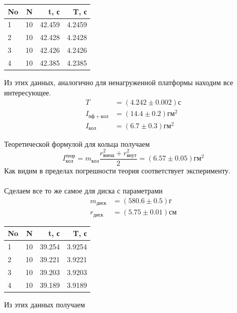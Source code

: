 \documentclass[a4paper, 12pt]{article}
\begin{document}
    \begin{table}[h!]
    \begin{center}
    \begin{tabular}{|l|r|r|r|}
    \hline
    No &   N &       t, с &         T, с \\
    \hline
    1  &  10 &  42.459 &  4.2459 \\
    2  &  10 &  42.428 &  4.2428 \\
    3  &  10 &  42.426 &  4.2426 \\
    4  &  10 &  42.385 &  4.2385 \\
    \hline
    \end{tabular}
    \end{center}
    \end{table}
    Из этих данных, аналогично для ненагруженной платформы находим все интересующее.
    \begin{align*}
    T &= (4.242 \pm 0.002)с \\
    I_{пф+кол}&=(14.4 \pm 0.2)гм^2 \\
    I_{кол}&=(6.7 \pm 0.3)гм^2
    \end{align*}

    Теоретической формулой для кольца получаем
    \[I^{теор}_{кол} = m_{кол}\frac{r_{внеш}^2 + r_{внут}^2}{2} = (6.57 \pm 0.05)гм^2\]
    Как видим в пределах погрешности теория соответствует эксперименту.
    \paragraph{}
    Сделаем все то же самое для диска с параметрами
    \begin{align*}
    m_{диск} &= (580.6 \pm 0.5) г \\
    r_{диск} &= (5.75 \pm 0.01) см
    \end{align*}

    \begin{table}[h!]
    \begin{center}
    \begin{tabular}{|l|r|r|r|}
    \hline
    No &   N &       t, с &         T, с \\
    \hline
    1  &  10 &  39.254 &  3.9254 \\
    2  &  10 &  39.221 &  3.9221 \\
    3  &  10 &  39.203 &  3.9203 \\
    4  &  10 &  39.189 &  3.9189 \\
    \hline
    \end{tabular}
    \end{center}
    \end{table}
    Из этих данных получаем
\end{document}
